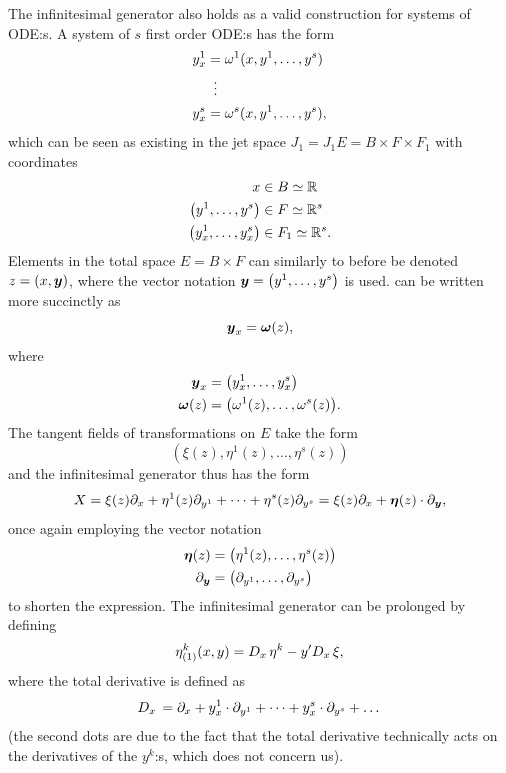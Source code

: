 The infinitesimal generator also holds as a valid construction for systems of ODE:s.
A system of \(s\) first order ODE:s has the form
\begin{align}
  \begin{split} \label{eq:first-order-system-ode}
    y^1_x &= \omega^1(x, y^1, \dots, y^s) \\
    &\equalsvdots \\
    y^s_x &= \omega^s(x, y^1, \dots, y^s),
  \end{split}
\end{align}
which can be seen as existing in the jet space \(J_1 = J_1 E = B \times F \times F_1\) with coordinates
\begin{align*}
  x &\in B \simeq \reals \\
  \left(y^1, \dots, y^s\right) &\in F \simeq \reals^s \\
  \left(y^1_x, \dots, y^s_x\right) &\in F_1 \simeq \reals^s.
\end{align*}
Elements in the total space \(E = B \times F\) can similarly to before be denoted \(z = \left(x, \vect{y}\right)\), where the vector notation \(\vect{y} = \left(y^1, \dots, y^s\right)\) is used.
 can be written more succinctly as
\begin{equation} \label{eq:first-order-system-ode-short}
  \boldsymbol{y}_x = \boldsymbol{\omega}(z),
\end{equation}
where
\begin{align*}
  \vect{y}_x &= \left(y^1_x, \dots, y^s_x\right)\\
  \vect{\omega}(z) &= \left(\omega^1(z), \dots, \omega^s(z)\right).
\end{align*}
The tangent fields of transformations on \(E\) take the form
\begin{equation*} %
  \left(\xi(z), \eta^1(z), \dots, \eta^s(z)\right)
\end{equation*}
and the infinitesimal generator thus has the form
\begin{equation*}
  X = \xi(z) \partial_x + \eta^1(z) \partial_{y^1} + \dots + \eta^s(z) \partial_{y^s} = \xi(z) \partial_x + \boldsymbol{\eta}(z) \cdot \partial_{\boldsymbol{y}},
\end{equation*}
once again employing the vector notation
\begin{align*}
  \vect{\eta}(z) &= \left(\eta^1(z), \dots, \eta^s(z)\right)\\
  \partial_{\vect{y}} &= \left(\partial_{y^1}, \dots, \partial_{y^s}\right)
\end{align*}
to shorten the expression.
The infinitesimal generator can be prolonged by defining
\begin{equation*}
  {\eta^k_{(1)}}(x,y) =
  D_{x}\, \eta^k - y' D_{x}\, \xi,
\end{equation*}
where the total derivative is defined as
\begin{equation*}
  D_{x}\, = \partial_x + y^1_x \cdot \partial_{y^1} + \dots + y^s_x \cdot \partial_{y^s} + \dots
\end{equation*}
(the second dots are due to the fact that the total derivative technically acts on the derivatives of the \(y^k\):s, which does not concern us).

